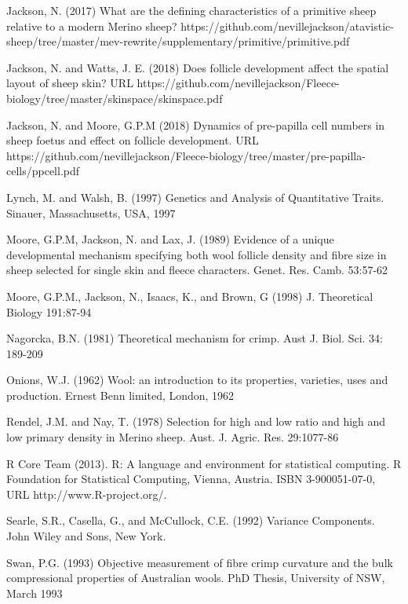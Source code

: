 \documentclass[titlepage]{article}  %
\begin{document}
\begin{thebibliography}{99}
Jackson, N. (2017) What are the defining characteristics of a primitive sheep relative to a modern Merino sheep? https://github.com/nevillejackson/atavistic-sheep/tree/master/mev-rewrite/supplementary/primitive/primitive.pdf

Jackson, N. and Watts, J. E. (2018) Does follicle development affect the spatial layout of sheep skin? URL https://github.com/nevillejackson/Fleece-biology/tree/master/skinspace/skinspace.pdf

Jackson, N. and Moore, G.P.M (2018) Dynamics of pre-papilla cell numbers in sheep foetus and effect on follicle development. URL https://github.com/nevillejackson/Fleece-biology/tree/master/pre-papilla-cells/ppcell.pdf

Lynch, M. and Walsh, B. (1997) Genetics and Analysis of Quantitative Traits. Sinauer, Massachusetts, USA, 1997

Moore, G.P.M, Jackson, N. and Lax, J. (1989) Evidence of a unique developmental mechanism specifying both wool follicle density and fibre size in sheep selected for single skin and fleece characters. Genet. Res. Camb.  53:57-62

Moore, G.P.M., Jackson, N., Isaacs, K., and Brown, G (1998) J. Theoretical Biology 191:87-94

Nagorcka, B.N. (1981) Theoretical mechanism for crimp.
     Aust J. Biol. Sci. 34: 189-209

Onions, W.J. (1962) Wool: an introduction to its properties, varieties, uses
     and production. Ernest Benn limited, London, 1962

Rendel, J.M. and Nay, T. (1978) Selection for high and low ratio and high 
    and low primary density in Merino sheep. 
    Aust. J. Agric. Res. 29:1077-86

R Core Team (2013). R: A language and environment for statistical
  computing. R Foundation for Statistical Computing, Vienna, Austria.
  ISBN 3-900051-07-0, URL http://www.R-project.org/.

Searle, S.R., Casella, G., and McCullock, C.E. (1992) Variance Components.
    John Wiley and Sons, New York.


Swan, P.G. (1993) Objective measurement of fibre crimp curvature and the bulk compressional properties of Australian wools. PhD Thesis, University of NSW, March 1993 


\end{thebibliography}
\end{document}
